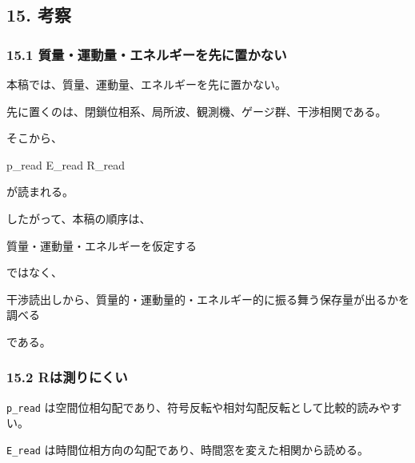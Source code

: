 \documentclass[
  a4paper,
]{article}
\newenvironment{Shaded}{}{}
\newcommand{\NormalTok}[1]{#1}
\begin{document}
\subsection{15. 考察}\label{ux8003ux5bdf}

\subsubsection{15.1
質量・運動量・エネルギーを先に置かない}\label{ux8ceaux91cfux904bux52d5ux91cfux30a8ux30cdux30ebux30aeux30fcux3092ux5148ux306bux7f6eux304bux306aux3044}

本稿では、質量、運動量、エネルギーを先に置かない。

先に置くのは、閉鎖位相系、局所波、観測機、ゲージ群、干渉相関である。

そこから、

\begin{Shaded}
\begin{Highlighting}[]
\NormalTok{p\_read}
\NormalTok{E\_read}
\NormalTok{R\_read}
\end{Highlighting}
\end{Shaded}

が読まれる。

したがって、本稿の順序は、

\begin{Shaded}
\begin{Highlighting}[]
\NormalTok{質量・運動量・エネルギーを仮定する}
\end{Highlighting}
\end{Shaded}

ではなく、

\begin{Shaded}
\begin{Highlighting}[]
\NormalTok{干渉読出しから、質量的・運動量的・エネルギー的に振る舞う保存量が出るかを調べる}
\end{Highlighting}
\end{Shaded}

である。

\subsubsection{15.2
Rは測りにくい}\label{rux306fux6e2cux308aux306bux304fux3044}

\texttt{p\_read}
は空間位相勾配であり、符号反転や相対勾配反転として比較的読みやすい。

\texttt{E\_read}
は時間位相方向の勾配であり、時間窓を変えた相関から読める。
\end{document}
